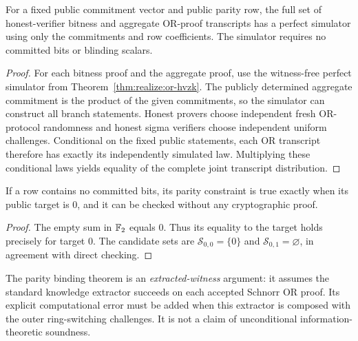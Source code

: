 \begin{theorem}\label{thm:realize:parity-hvzk}
For a fixed public commitment vector and
public parity row, the full set of
honest-verifier bitness and aggregate
OR-proof transcripts has a
perfect simulator using only the
commitments and row coefficients.
The simulator requires no committed bits
or blinding scalars.
\end{theorem}
\begin{proof}
For each bitness proof and the aggregate
proof, use the witness-free perfect simulator
from Theorem~\ref{thm:realize:or-hvzk}.
The publicly determined aggregate
commitment is the product of the
given commitments, so the simulator can
construct all branch statements.
Honest provers choose independent
fresh OR-protocol randomness and
honest sigma verifiers choose independent
uniform challenges. Conditional on the
fixed public statements, each OR transcript
therefore has exactly its independently
simulated law. Multiplying these conditional
laws yields equality of the complete
joint transcript distribution.
\end{proof}

\begin{corollary}\label{cor:realize:empty-row}
If a row contains no committed bits,
its parity constraint is true exactly when
its public target is $0$, and it can be checked
without any cryptographic proof.
\end{corollary}
\begin{proof}
The empty sum in $\mathbb{F}_2$ equals $0$.
Thus its equality to the target holds
precisely for target $0$.
The candidate sets are
$\mathcal S_{0,0}=\{0\}$ and
$\mathcal S_{0,1}=\varnothing$,
in agreement with direct checking.
\end{proof}

\begin{remark}
The parity binding theorem is an
\emph{extracted-witness} argument:
it assumes the standard knowledge
extractor succeeds on each accepted
Schnorr OR proof. Its explicit
computational error must be added
when this extractor is composed with
the outer ring-switching challenges.
It is not a claim of unconditional
information-theoretic soundness.
\end{remark}

